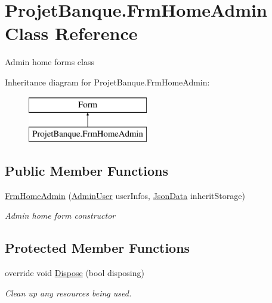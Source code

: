 \hypertarget{class_projet_banque_1_1_frm_home_admin}{}\section{Projet\+Banque.\+Frm\+Home\+Admin Class Reference}
\label{class_projet_banque_1_1_frm_home_admin}


Admin home form\textquotesingle{}s class  


Inheritance diagram for Projet\+Banque.\+Frm\+Home\+Admin\+:\begin{figure}[H]
\begin{center}
\leavevmode
\includegraphics[height=2.000000cm]{class_projet_banque_1_1_frm_home_admin}
\end{center}
\end{figure}
\subsection*{Public Member Functions}
\begin{DoxyCompactItemize}
\item 
\mbox{\hyperlink{class_projet_banque_1_1_frm_home_admin_a9bcab88db38eabe3f71e4bb95f30ac8c}{Frm\+Home\+Admin}} (\mbox{\hyperlink{class_projet_banque_1_1_admin_user}{Admin\+User}} user\+Infos, \mbox{\hyperlink{class_projet_banque_1_1_json_data}{Json\+Data}} inherit\+Storage)
\begin{DoxyCompactList}\small\item\em Admin home form constructor \end{DoxyCompactList}\end{DoxyCompactItemize}
\subsection*{Protected Member Functions}
\begin{DoxyCompactItemize}
\item 
override void \mbox{\hyperlink{class_projet_banque_1_1_frm_home_admin_a460a6dce4ef129c07dd33accd4192cc5}{Dispose}} (bool disposing)
\begin{DoxyCompactList}\small\item\em Clean up any resources being used. \end{DoxyCompactList}\end{DoxyCompactItemize}


